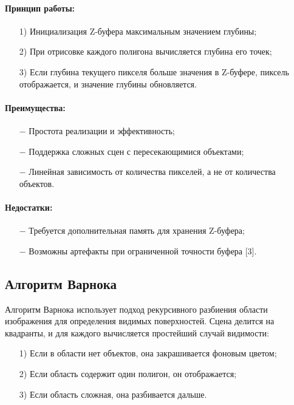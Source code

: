 \paragraph{Принцип работы:}
\begin{itemize}
	\item[1)] Инициализация Z-буфера максимальным значением глубины;
    \item[2)] При отрисовке каждого полигона вычисляется глубина его точек;
    \item[3)] Если глубина текущего пикселя больше значения в Z-буфере, пиксель отображается, и значение глубины обновляется.
\end{itemize}

\paragraph{Преимущества:}
\begin{itemize}
	\item[$-$] Простота реализации и эффективность;
    \item[$-$] Поддержка сложных сцен с пересекающимися объектами;
    \item[$-$] Линейная зависимость от количества пикселей, а не от количества объектов.
\end{itemize}
\paragraph{Недостатки:}
\begin{itemize}
	\item[$-$] Требуется дополнительная память для хранения Z-буфера;
    \item[$-$] Возможны артефакты при ограниченной точности буфера [3].
\end{itemize}

\subsection{Алгоритм Варнока}

Алгоритм Варнока использует подход рекурсивного разбиения области изображения для определения видимых поверхностей. Сцена делится на квадранты, и для каждого вычисляется простейший случай видимости:
\begin{itemize}
	\item[1)] Если в области нет объектов, она закрашивается фоновым цветом;
    \item[2)] Если область содержит один полигон, он отображается;
    \item[3)] Если область сложная, она разбивается дальше.
\end{itemize}

